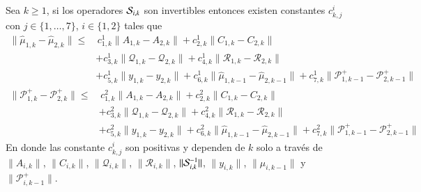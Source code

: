 \begin{teo}
	Sea $k \geq 1$, si los operadores $\S_{i,k}$ son invertibles entonces existen constantes $c_{k,j}^i$ con $j \in \{ 1, \dots, 7\}$, $i \in \{ 1, 2\}$ tales que
	 \begin{equation*}
	 	\begin{aligned}
	 		\| \hat \mu_{1,k} - \hat \mu_{2,k}  \| \leq & \, c_{1,k}^1 \| A_{1, k} - A_{2, k} \| +  c_{2,k}^1 \| C_{1, k} - C_{2, k} \| \\ 
	 		&+ c_{3,k}^1 \| \mathcal{Q}_{1, k} - \mathcal{Q}_{2, k} \| +c_{4,k}^1 \| \mathcal{R}_{1, k} - \mathcal{R}_{2, k} \| \\
	 		& + c_{5,k}^1 \| y_{1,k} - y_{2,k} \| + c_{6,k}^1 \| \hat \mu_{1, k-1} - \hat \mu_{2, k-1} \| + c_{7,k}^1 \| \mathcal{P}_{1, k-1}^+ - \mathcal{P}_{2, k-1}^+ \|
	 	\end{aligned}
	 \end{equation*}
	 \begin{equation*}
	 	\begin{aligned}
	 		\| \mathcal{P}_{1,k}^+ - \mathcal{P}_{2,k}^+  \| \leq & \, c_{1,k}^2 \| A_{1, k} - A_{2, k} \| +  c_{2,k}^2 \| C_{1, k} - C_{2, k} \| \\ 
	 		&+ c_{3,k}^2 \| \mathcal{Q}_{1, k} - \mathcal{Q}_{2, k} \| + c_{4,k}^2 \| \mathcal{R}_{1, k} - \mathcal{R}_{2, k} \| \\
	 		&+ c_{5,k}^2 \| y_{1,k} - y_{2,k} \|+ c_{6,k}^2 \| \hat \mu_{1, k-1} - \hat \mu_{2, k-1} \| + c_{7,k}^2 \| \mathcal{P}_{1, k-1}^+ - \mathcal{P}_{2, k-1}^+ \|
	 	\end{aligned}
	 \end{equation*}
	 En donde las constante $c_{k,j}^i$ son positivas y dependen de $k$ solo a través de $\| A_{i,k} \| $, $\| C_{i,k}\| $, $\| \mathcal{Q}_{i,k} \| $, $\| \mathcal{R}_{i,k} \| $, $\| \S_{i,k}^{-1} \| $, $\| y_{i,k}\|$, $\| \mu_{i,k-1} \| $ y $\| \mathcal{P}_{i,k-1}^+ \| $.
	 \label{teo:error_kalman}
\end{teo}
